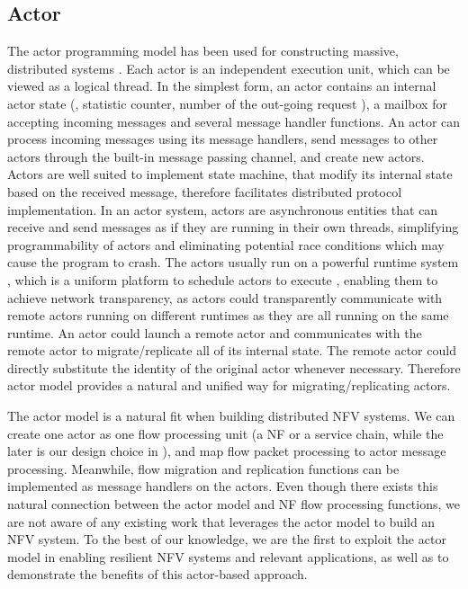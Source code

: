 \subsection{Actor}

The actor programming model has been used for constructing massive, distributed systems \cite{actor-wiki, akka, newell2016optimizing, AnalysisActor}. Each actor is an independent execution unit, which can be viewed as a logical thread. In the simplest form, an actor contains an internal actor state (\eg, statistic counter, number of the out-going request %
), a mailbox for accepting incoming messages and several message handler functions. An actor can process incoming messages using its message handlers, send messages to other actors through the built-in message passing channel, and create new actors. Actors are well suited to implement state machine, that modify its internal state based on the received message, therefore facilitates distributed protocol implementation.%
In an actor system, actors are asynchronous entities that can receive and send messages as if they are running in their own threads, simplifying programmability of actors and eliminating potential race conditions which may cause the program to crash.
The actors usually run on a powerful runtime system \cite{erlang, akka, caf}, which is a uniform platform to schedule actors to execute
, enabling them to achieve network transparency, as actors could transparently communicate with remote actors running on different runtimes as they are all running on the same runtime.
An actor could launch a remote actor and communicates with the remote actor to migrate/replicate all of its internal state. The remote actor could directly substitute the identity of the original actor whenever necessary. Therefore actor model provides a natural and unified way for migrating/replicating actors.

The actor model is a natural fit when building distributed NFV systems. We can create one actor as one flow processing unit (a NF or a service chain, while the later is our design choice in \nfactor), and map flow packet processing to actor message processing. Meanwhile, flow migration and replication functions can be implemented as message handlers on the actors. Even though there exists this natural connection between the actor model and NF flow processing functions, we are not aware of any existing work that leverages the actor model to build an NFV system. %
 To the best of our knowledge, we are the first to exploit the actor model in enabling resilient NFV systems and relevant applications, as well as to demonstrate the benefits of this actor-based approach.


